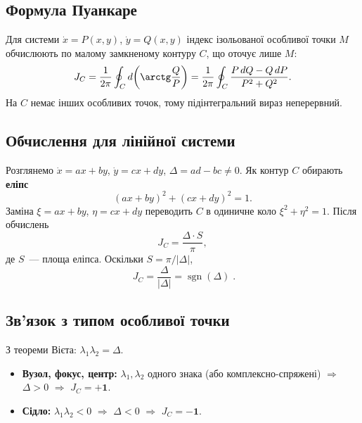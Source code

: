 \documentclass[12pt,a4paper]{article}
\theoremstyle{definition}
\theoremstyle{plain}
\begin{document}
\subsection{Формула Пуанкаре}

Для системи $\dot x=P(x,y)$, $\dot y=Q(x,y)$ індекс ізольованої особливої
точки $M$ обчислюють по малому замкненому контуру $C$, що оточує лише $M$:
\begin{equation}
  J_C = \frac{1}{2\pi}\oint_C d\!\left(\arctg\frac{Q}{P}\right)
  = \frac{1}{2\pi}\oint_C \frac{P\,dQ - Q\,dP}{P^2+Q^2}.
\end{equation}
На $C$ немає інших особливих точок, тому підінтегральний вираз неперервний.

\subsection{Обчислення для лінійної системи}

Розглянемо $\dot x=ax+by$, $\dot y=cx+dy$, $\Delta=ad-bc\neq0$.
Як контур $C$ обирають \textbf{еліпс}
\begin{equation}
  (ax+by)^2 + (cx+dy)^2 = 1.
\end{equation}
Заміна $\xi=ax+by$, $\eta=cx+dy$ переводить $C$ в одиничне коло
$\xi^2+\eta^2=1$. Після обчислень
\begin{equation}
  J_C = \frac{\Delta\cdot S}{\pi},
\end{equation}
де $S$~--- площа еліпса. Оскільки $S=\pi/|\Delta|$,
\begin{equation}
  \boxed{\;J_C = \frac{\Delta}{|\Delta|} = \operatorname{sgn}(\Delta)\;}.
\end{equation}

\subsection{Зв'язок з типом особливої точки}

З теореми Вієта: $\lambda_1\lambda_2=\Delta$.

\begin{itemize}[leftmargin=1.4em]
  \item \textbf{Вузол, фокус, центр:} $\lambda_1,\lambda_2$ одного знака
        (або комплексно-спряжені) $\Rightarrow$ $\Delta>0$ $\Rightarrow$
        $J_C=\mathbf{+1}$.
  \item \textbf{Сідло:} $\lambda_1\lambda_2<0$ $\Rightarrow$ $\Delta<0$
        $\Rightarrow$ $J_C=\mathbf{-1}$.
\end{itemize}
\end{document}
